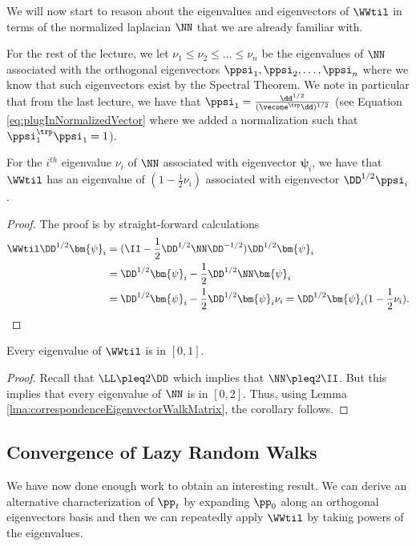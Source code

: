 We will now start to reason about the eigenvalues and eigenvectors of $\WWtil$ in terms of the normalized laplacian $\NN$ that we are already familiar with.

For the rest of the lecture, we let $\nu_1 \leq \nu_2 \leq \dots \leq \nu_n$ be the eigenvalues of $\NN$ associated with the orthogonal eigenvectors $\ppsi_1, \ppsi_2, \dots, \ppsi_n$ where we know that such eigenvectors exist by the Spectral Theorem. We note in particular that from the last lecture, we have that $\ppsi_1 = \frac{\dd^{1/2}}{(\vecone^{\trp} \dd)^{1/2}}$ (see Equation \ref{eq:plugInNormalizedVector} where we added a normalization such that $\ppsi_1^{\trp} \ppsi_1 = 1$).

\begin{lemma}\label{lma:correspondenceEigenvectorWalkMatrix}
For the $i^{th}$ eigenvalue $\nu_i$ of $\NN$ associated with eigenvector $\bm{\psi}_i$, we have that $\WWtil$ has an eigenvalue of $(1 - \frac{1}{2}\nu_i)$ associated with eigenvector $\DD^{1/2} \ppsi_i$.
\end{lemma}
\begin{proof}
The proof is by straight-forward calculations
\begin{align*}
    \WWtil \DD^{1/2} \bm{\psi}_i &= (\II - \frac{1}{2} \DD^{1/2}\NN \DD^{-1/2})\DD^{1/2} \bm{\psi}_i \\ &= \DD^{1/2} \bm{\psi}_i - \frac{1}{2} \DD^{1/2}\NN \bm{\psi}_i \\
    &=\DD^{1/2} \bm{\psi}_i - \frac{1}{2} \DD^{1/2}\bm{\psi}_i \nu_i = \DD^{1/2} \bm{\psi}_i (1 - \frac{1}{2}\nu_i).
\end{align*}
\end{proof}

\begin{corollary}
Every eigenvalue of $\WWtil$ is in $[0,1]$.
\end{corollary}
\begin{proof}
Recall that $\LL \pleq 2\DD$ which implies that $\NN \pleq 2 \II$. But this implies that every eigenvalue of $\NN$ is in $[0,2]$. Thus, using Lemma \ref{lma:correspondenceEigenvectorWalkMatrix}, the corollary follows.
\end{proof}

\subsection{Convergence of Lazy Random Walks}

We have now done enough work to obtain an interesting result. We can derive an alternative characterization of $\pp_t$ by expanding $\pp_0$ along an orthogonal eigenvectors basis and then we can repeatedly apply $\WWtil$ by taking powers of the eigenvalues. 

